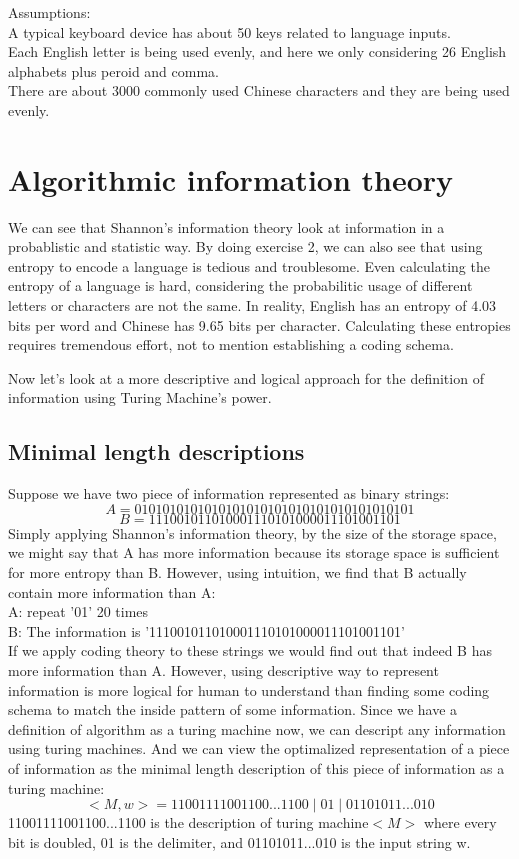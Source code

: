 \documentclass[12pt]{article}
\begin{document}
Assumptions:\\
A typical keyboard device has about 50 keys related to language inputs.\\
Each English letter is being used evenly, and here we only considering 26 English alphabets plus peroid and comma.\\
There are about 3000 commonly used Chinese characters and they are being used evenly.\\

\section{Algorithmic information theory}
We can see that Shannon's information theory look at information in a probablistic and statistic way. By doing exercise 2, we can also see that using entropy to encode a language is tedious and troublesome. Even calculating the entropy of a language is hard, considering the probabilitic usage of different letters or characters are not the same. In reality, English has an entropy of 4.03 bits per word and Chinese has 9.65 bits per character. Calculating these entropies requires tremendous effort, not to mention establishing a coding schema.

Now let's look at a more descriptive and logical approach for the definition of information using Turing Machine's power.\cite{sipser06}

\subsection{Minimal length descriptions}
Suppose we have two piece of information represented as binary strings:
\[
	A = 0101010101010101010101010101010101010101
\]
\[
	B = 111001011010001110101000011101001101
\]
Simply applying Shannon's information theory, by the size of the storage space, we might say that A has more information because its storage space is sufficient for more entropy than B. However, using intuition, we find that B actually contain more information than A:\\ 

A: repeat '01' 20 times\\

B: The information is '111001011010001110101000011101001101'\\

If we apply coding theory to these strings we would find out that indeed B has more information than A. However, using descriptive way to represent information is more logical for human to understand than finding some coding schema to match the inside pattern of some information. Since we have a definition of algorithm as a turing machine now, we can descript any information using turing machines. And we can view the optimalized representation of a piece of information as the minimal length description of this piece of information as a turing machine:
\[
	<M, w> = 11001111001100...1100 \mid 01 \mid 01101011...010
\]
11001111001100...1100 is the description of turing machine$<M>$ where every bit is doubled, 01 is the delimiter, and 01101011...010 is the input string w.\\
\end{document}
